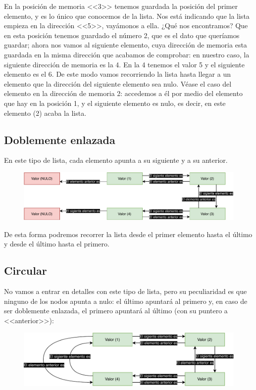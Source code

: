 \documentclass[11pt, oneside]{book}		%
\begin{document}
		En la posición de memoria <<3>> tenemos guardada la posición del primer elemento, y es lo único que conocemos de la lista. Nos está indicando que la lista empieza en la dirección <<5>>, vayámonos a ella. ¿Qué nos encontramos? Que en esta posición tenemos guardado el número 2, que es el dato que queríamos guardar; ahora nos vamos al siguiente elemento, cuya dirección de memoria esta guardada en la misma dirección que acabamos de comprobar: en nuestro caso, la siguiente dirección de memoria es la 4. En la 4 tenemos el valor 5 y el siguiente elemento es el 6. De este modo vamos recorriendo la lista hasta llegar a un elemento que la dirección del siguiente elemento sea nulo. Véase el caso del elemento en la dirección de memoria 2: accedemos a él por medio del elemento que hay en la posición 1, y el siguiente elemento es nulo, es decir, en este elemento (2) acaba la lista.
		\subsection{Doblemente enlazada}
		En este tipo de lista, cada elemento apunta a su siguiente y a su anterior.
		\begin{figure}[H]
			\centering
			\hspace*{-0.9in}\includegraphics{img/TiposEnumerables/Lista/list2.pdf}
		\end{figure}
		De esta forma podremos recorrer la lista desde el primer elemento hasta el último y desde el último hasta el primero.
		\subsection{Circular}
		No vamos a entrar en detalles con este tipo de lista, pero su peculiaridad es que ninguno de los nodos apunta a nulo: el último apuntará al primero y, en caso de ser doblemente enlazada, el primero apuntará al último (con su puntero a <<anterior>>):
		\begin{figure}[H]
			\centering
			\hspace*{-0.6in}\includegraphics{img/TiposEnumerables/Lista/list3.pdf}
		\end{figure}
\end{document}
